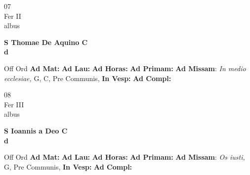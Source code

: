 \documentclass[10pt, openany]{book}
\begin{document}
    \begin{center}
        \begin{minipage}{3.5in}
            \vspace{2em}
            \begin{minipage}{0.5in}
                {\Huge 07} \\
                {\normalsize Fer II} \\
                {\normalsize albus}
            \end{minipage}
            \begin{minipage}{3.0in}
                \textbf{ \large S Thomae De Aquino C \\
                \textnormal{\normalsize d}} \\ 
            \end{minipage}
            \begin{justify}Off Ord
                \textbf{Ad Mat: }
                \textbf{Ad Lau: }
                \textbf{Ad Horas: }
                \textbf{Ad Primam: }\textbf{Ad Missam}: \textit{In medio ecclesiae,} G, C, Pre Communis,  
                \textbf{In Vesp: }
                \textbf{Ad Compl: }
            \end{justify}
        \end{minipage}
    \end{center}

    \begin{center}
        \begin{minipage}{3.5in}
            \vspace{2em}
            \begin{minipage}{0.5in}
                {\Huge 08} \\
                {\normalsize Fer III} \\
                {\normalsize albus}
            \end{minipage}
            \begin{minipage}{3.0in}
                \textbf{ \large S Ioannis a Deo C \\
                \textnormal{\normalsize d}} \\ 
            \end{minipage}
            \begin{justify}Off Ord
                \textbf{Ad Mat: }
                \textbf{Ad Lau: }
                \textbf{Ad Horas: }
                \textbf{Ad Primam: }\textbf{Ad Missam}: \textit{Os iusti,} G, Pre Communis,  
                \textbf{In Vesp: }
                \textbf{Ad Compl: }
            \end{justify}
        \end{minipage}
    \end{center}
\end{document}
